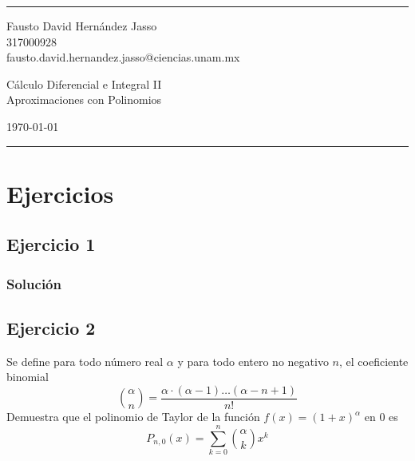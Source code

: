 \documentclass[a4paper]{article}
\begin{document}

\fancyhead[C]{}
\hrule \medskip %
\begin{minipage}{0.35\textwidth} 
\raggedright
\footnotesize
Fausto David Hernández Jasso \hfill\\   
317000928 \hfill\\
fausto.david.hernandez.jasso@ciencias.unam.mx
\end{minipage}
\begin{minipage}{0.4\textwidth} 
\centering 
\large 
Cálculo Diferencial e Integral II\\ 
\normalsize 
Aproximaciones con Polinomios\\ 
\end{minipage}
\begin{minipage}{0.24\textwidth} 
\raggedleft
\today\hfill\\
\end{minipage}
\medskip\hrule 
\bigskip
\section{Ejercicios}
\subsection{Ejercicio 1}
\noindent
\subsubsection*{Solución}
\newpage
\subsection{Ejercicio 2}
\noindent
Se define para todo número real \(\alpha\) y para todo entero no negativo \(n\), el coeficiente 
binomial
\[
    \binom{\alpha}{n} = \frac{\alpha \cdot \left(\alpha - 1\right) \dotsc \left(\alpha - n + 1\right)}{n!}
\]
Demuestra que el polinomio de Taylor de la función \(f(x) = \left(1 + x\right)^{\alpha}\) en \(0\)
es
\[
    P_{n, 0}(x) = \sum_{k = 0}^{n} \binom{\alpha}{k} x^{k}
\]
\end{document}
